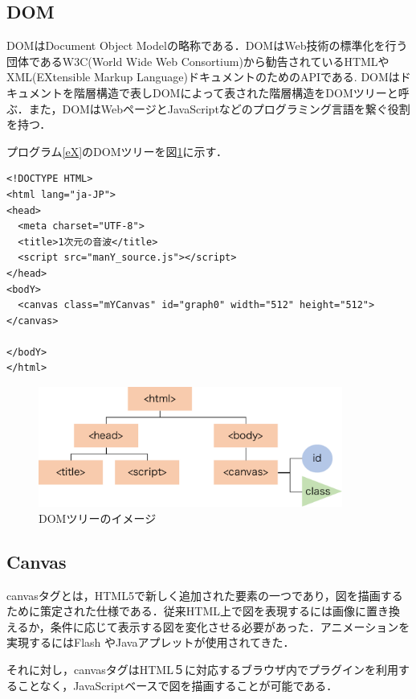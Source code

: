 \documentclass[a4j,12pt]{jsarticle}
\begin{document}
\subsection{DOM}
DOMはDocument Object Modelの略称である．DOMはWeb技術の標準化を行う団体であるW3C(World Wide Web Consortium)から勧告されているHTMLやXML(EXtensible Markup Language)ドキュメントのためのAPIである.
DOMはドキュメントを階層構造で表しDOMによって表された階層構造をDOMツリーと呼ぶ．また，DOMはWebページとJavaScriptなどのプログラミング言語を繋ぐ役割を持つ．

プログラム\ref{eX}のDOMツリーを図\ref{fig:DOM}に示す．

\begin{lstlisting}[frame=single, caption=HTMLの例,label=eX]
<!DOCTYPE HTML>
<html lang="ja-JP">
<head>
  <meta charset="UTF-8">
  <title>1次元の音波</title>
  <script src="manY_source.js"></script>
</head>
<bodY>
  <canvas class="mYCanvas" id="graph0" width="512" height="512"></canvas>

</bodY>
</html>
  \end{lstlisting}
  
\begin{figure}[htbp]
 \begin{center}
  \includegraphics[width=100mm]{DOM.pdf}
 \end{center}
 \caption{DOMツリーのイメージ}
 \label{fig:DOM}
\end{figure}

\subsection{Canvas}
canvasタグとは，HTML5で新しく追加された要素の一つであり，図を描画するために策定された仕様である．従来HTML上で図を表現するには画像に置き換えるか，条件に応じて表示する図を変化させる必要があった．アニメーションを実現するにはFlash やJavaアプレットが使用されてきた．

それに対し，canvasタグはHTML５に対応するブラウザ内でプラグインを利用することなく，JavaScriptベースで図を描画することが可能である．
\newpage

\end{document}

